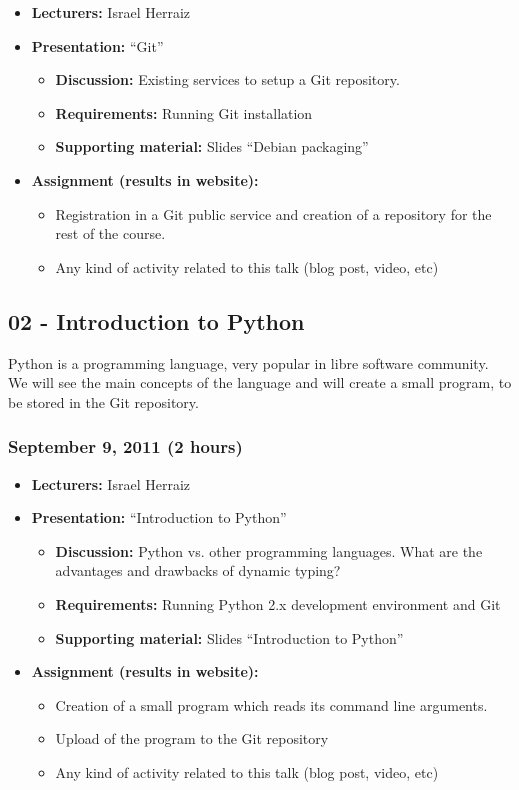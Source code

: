 \documentclass[a4paper]{article}
\begin{document}
\begin{itemize}
\item \textbf{Lecturers:} Israel Herraiz
\item \textbf{Presentation:} ``Git''
  \begin{itemize}
  \item \textbf{Discussion:} Existing services to setup a Git
    repository.
  \item \textbf{Requirements:} Running Git installation
  \item \textbf{Supporting material:} Slides ``Debian packaging''
  \end{itemize}
\item \textbf{Assignment (results in website):}
  \begin{itemize}
  \item Registration in a Git
    public service and creation of a repository for the rest of the
    course.
  \item Any kind of activity
    related to this talk (blog post, video, etc)
  \end{itemize}
\end{itemize}

\subsection{02 - Introduction to Python}

Python is a programming language, very popular in libre software
community. We will see the main concepts of the language and will
create a small program, to be stored in the Git repository.

\subsubsection{September 9, 2011 (2 hours)}

\begin{itemize}
\item \textbf{Lecturers:} Israel Herraiz
\item \textbf{Presentation:} ``Introduction to Python''
  \begin{itemize}
  \item \textbf{Discussion:} Python vs. other programming
    languages. What are the advantages and drawbacks of dynamic
    typing?
  \item \textbf{Requirements:} Running Python 2.x development
    environment and Git
  \item \textbf{Supporting material:} Slides ``Introduction to Python''
  \end{itemize}
\item \textbf{Assignment (results in website):} 
  \begin{itemize}
  \item Creation of a small program which reads its command line
    arguments.
  \item Upload of the program to the Git repository
  \item Any kind of activity
    related to this talk (blog post, video, etc)
  \end{itemize}
\end{itemize}
\end{document}
